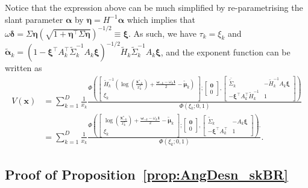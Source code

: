 \documentclass[12pt]{article}
\begin{document}
Notice that the expression above can be much simplified by re-parametrising the slant parameter $\bm \alpha$ by $\bm \eta =  H^{-1}\bm\alpha$ which implies that $\omega \bm \delta = \Sigma\bm\eta\left(\sqrt{1+\bm\eta^\top\Sigma\bm\eta}\right)^{-1/2} \equiv \bm\xi$. As such, we have $\tau_k = \xi_k$ and $\tilde{\bm\alpha}_k = \left(1-\bm\xi^\top A_k^\top\tilde\Sigma_k^{-1} A_k \bm\xi \right)^{-1/2} \tilde H_k\tilde\Sigma_k^{-1}A_k \bm\xi$, and the exponent function can be written as
%
\begin{align*}
V(\bm x) &= \sum_{k=1}^D \frac{1}{x_k} 
\frac{\Phi \left(
    \begin{bmatrix} 
        \tilde H_k^{-1}\left( \log \left( \frac{\bm x^*_{-k}}{x^*_k} \right) + \frac{\bm\omega_{-k} - \omega_k\bm 1}{2} - \tilde{\bm \mu}_k\right)  \\
        \xi_k
    \end{bmatrix};
    \begin{bmatrix} 
    \bm 0 \\ 0
    \end{bmatrix},
    \begin{bmatrix}
        \bar{\tilde\Sigma}_k & - \tilde H_k^{-1} A_k \bm \xi  \\
       - \bm \xi^\top A_k^\top \tilde H_k^{-1} &	1
    \end{bmatrix} \right)
    }
    {\Phi\left(\xi_k; 0, 1\right)} \\
 &= \sum_{k=1}^D \frac{1}{x_k} 
\frac{\Phi \left(
    \begin{bmatrix} 
        \log \left( \frac{\bm x^*_{-k}}{x^*_k} \right) + \frac{\bm\omega_{-k} - \omega_k\bm 1}{2} - \tilde{\bm \mu}_k  \\
        \xi_k
    \end{bmatrix};
    \begin{bmatrix} 
    \bm 0 \\ 0
    \end{bmatrix},
    \begin{bmatrix}
        \tilde\Sigma_k & - A_k \bm \xi  \\
       - \bm \xi^\top A_k^\top &	1
    \end{bmatrix} \right).
    }
    {\Phi\left(\xi_k; 0, 1\right)}.  
\end{align*}
%

\subsection{Proof of Proposition~\ref{prop:AngDesn_skBR}}
\end{document}

